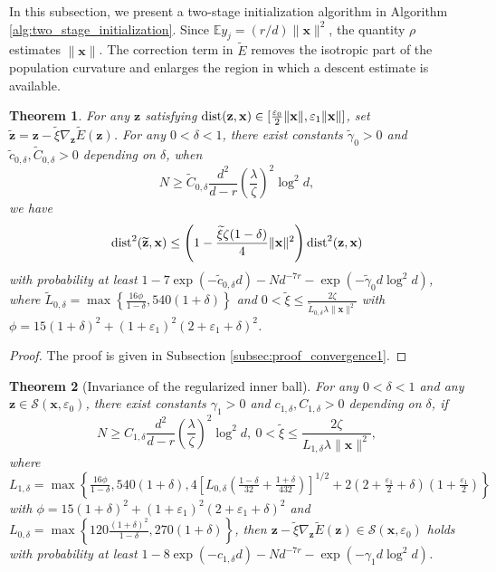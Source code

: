 \documentclass{article}
\newcommand{\E}{{\mathbb E}}
\newcommand{\calS}{{\mathcal S}}
\newcommand{\dist}{{\rm dist}}
\newcommand{\vx}{{\mathbf x}}
\newcommand{\vz}{{\mathbf z}}
\newcommand{\0}{{\mathbf 0}}
\newtheorem{theorem}{Theorem}[section]
\numberwithin{equation}{section}
\begin{document}
	In this subsection, we present a two-stage initialization algorithm in Algorithm \ref{alg:two_stage_initialization}. Since $\E y_j=(r/d)\|\vx\|^2$, the quantity $\rho$ estimates $\|\vx\|$. The correction term in $\widetilde E$ removes the isotropic part of the population curvature and enlarges the region in which a descent estimate is available.
	\begin{theorem}
		\label{theo:relation}
		For any $\vz$ satisfying $\dist(\vz,\vx)\in[\frac{\varepsilon_0}2\|\vx\|,\varepsilon_1\|\vx\|]$, set $\widetilde \vz=\vz-\widetilde\xi\nabla_{\vz} \widetilde E(\vz)$.
		For any $0<\delta<1$, there exist constants $\widetilde\gamma_0>0$ and $\widetilde c_{0,\delta},\widetilde C_{0,\delta}>0$ depending on $\delta$, 
		when 
		\begin{equation}\label{eq:N_tilde}
			N\ge \widetilde C_{0,\delta}\frac{d^2}{d-r}\left(\frac{\lambda}{\zeta}\right)^2\log^2d,
		\end{equation}  
		we have 
		\[\dist^2(\widetilde\vz,\vx)\le\left(1-\frac{\widetilde\xi\zeta(1-\delta)}4\|\vx\|^2\right)\dist^2(\vz,\vx)\]
		with probability at least $1-7\exp(-\widetilde c_{0,\delta} d)-Nd^{-7r}
		-\exp(-\widetilde\gamma_0 d\log^2 d)$, where $\widetilde L_{0,\delta}=\max\left\{\frac{16\phi}{1-\delta},540(1+\delta)\right\}$ and
		$0<\widetilde\xi\le \frac{2\zeta}{\widetilde L_{0,\delta}\lambda\|\vx\|^2}$ with $		\phi=15(1+\delta)^2+(1+\varepsilon_1)^2(2+\varepsilon_1+\delta)^2$.
		
	\end{theorem}
	\begin{proof}
		The proof is given in Subsection \ref{subsec:proof_convergence1}.
	\end{proof}
	\begin{theorem}[Invariance of the regularized inner ball]\label{theo:regularized_inner_invariance}
		For any $0<\delta<1$ and any $\vz\in\calS(\vx,\varepsilon_0)$, there exist constants $\gamma_1>0$ and $ c_{1,\delta}, C_{1,\delta}>0$ depending on $\delta$,  if
		\begin{equation}\label{eq:inner-step-size}
			N\ge  C_{1,\delta}\frac{d^2}{d-r}\left(\frac{\lambda}{\zeta}\right)^2\log^2d,\ 0<\widetilde\xi\le\frac{2\zeta}{ L_{1,\delta}\lambda\|\vx\|^2},
		\end{equation}
		where $ L_{1,\delta}=\max\left\{\frac{16\phi}{1-\delta},540(1+\delta),4\left[
		L_{0,\delta}
		\left(
		\frac{1-\delta}{32}
		+\frac{1+\delta}{432}
		\right)
		\right]^{1/2}
		+
		2\left(2+\frac{\varepsilon_1}{2}+\delta\right)
		\left(1+\frac{\varepsilon_1}{2}\right)\right\}$ with $		\phi=15(1+\delta)^2+(1+\varepsilon_1)^2(2+\varepsilon_1+\delta)^2$ and $L_{0,\delta}=\max\left\{120\frac{(1+\delta)^2}{1-\delta},270(1+\delta)\right\}$, then
		$
		\vz-\widetilde\xi\nabla_{\vz}\widetilde E(\vz)\in\calS(\vx,\varepsilon_0)$ holds with probability at least $1-8\exp(- c_{1,\delta} d)-Nd^{-7r}
		-\exp(-\gamma_1 d\log^2 d)$.
	\end{theorem}
\end{document}
